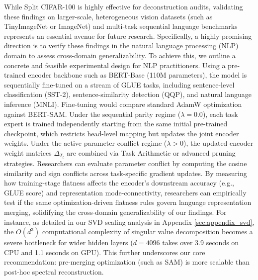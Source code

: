 While Split CIFAR-100 is highly effective for deconstruction audits, validating these
findings on larger-scale, heterogeneous vision datasets (such as TinyImageNet or ImageNet) and
multi-task sequential language benchmarks represents an essential avenue for future research.
Specifically, a highly promising direction is to verify these findings in the natural language
processing (NLP) domain to assess cross-domain generalizability. To achieve this, we outline a
concrete and feasible experimental design for NLP practitioners. Using a pre-trained encoder
backbone such as BERT-Base (110M parameters), the model is sequentially fine-tuned on a stream
of GLUE tasks, including sentence-level classification (SST-2), sentence-similarity detection (QQP),
and natural language inference (MNLI). Fine-tuning would compare standard AdamW optimization against
BERT-SAM. Under the sequential parity regime ($\lambda = 0.0$), each task expert is trained
independently starting from the same initial pre-trained checkpoint, which restricts head-level mapping
but updates the joint encoder weights. Under the active parameter conflict regime ($\lambda > 0$),
the updated encoder weight matrices $\Delta_{T_t}$ are combined via Task Arithmetic or advanced
pruning strategies. Researchers can evaluate parameter conflict by computing the cosine similarity
and sign conflicts across task-specific gradient updates. By measuring how training-stage flatness
affects the encoder's downstream accuracy (e.g., GLUE score) and representation mode-connectivity,
researchers can empirically test if the same optimization-driven flatness rules govern language
representation merging, solidifying the cross-domain generalizability of our findings. For instance,
as detailed in our SVD scaling analysis in Appendix \ref{sec:appendix_svd}, the $O(d^3)$ computational
complexity of singular value decomposition becomes a severe bottleneck for wider hidden layers
($d=4096$ takes over 3.9 seconds on CPU and 1.1 seconds on GPU). This further underscores our core
recommendation: pre-merging optimization (such as SAM) is more scalable than post-hoc spectral reconstruction.

